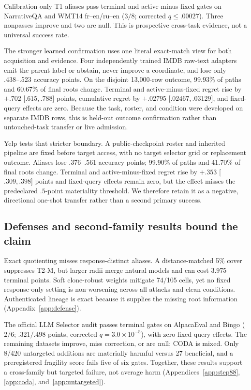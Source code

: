 Calibration-only T1 aliases pass terminal and active-minus-fixed gates on NarrativeQA and WMT14 fr--en/ru--en ($3/8$; corrected $q\leq.00027$). Three nonpasses improve and two are null. This is prospective cross-task evidence, not a universal success rate.

The stronger learned confirmation uses one literal exact-match view for both acquisition and evidence. Four independently trained IMDB raw-text adapters emit the parent label or abstain, never improve a coordinate, and lose only .438--.523 accuracy points. On the disjoint 13,000-row outcome, 99.93\% of paths and 60.67\% of final roots change. Terminal and active-minus-fixed regret rise by $+.702$ [$.615,.788$] points, cumulative regret by $+.02795$ [$.02467,.03129$], and fixed-query effects are zero. Because the task, roster, and condition were developed on separate IMDB rows, this is held-out outcome confirmation rather than untouched-task transfer or live admission.

Yelp tests that stricter boundary. A public-checkpoint roster and inherited pipeline are fixed before target access, with no target selector grid or replacement outcome. Aliases lose .376--.561 accuracy points; 99.90\% of paths and 41.70\% of final roots change. Terminal and active-minus-fixed regret rise by $+.353$ [$.309,.398$] points and fixed-query effects remain zero, but the effect misses the predeclared $.5$-point materiality threshold. We therefore retain it as a negative, directional one-shot transfer rather than a second primary success.

\subsection{Defenses and second-family results bound the claim}

Exact quotienting misses response-distinct aliases. A distance-matched 5\% cover suppresses T2-M, but larger radii merge natural models and can cost 3.975 terminal points. Soft clone-robust weights mitigate 74/105 cells, yet no fixed response-only setting is non-worsening across all attacks and clean conditions. Authenticated lineage is exact because it supplies the missing root information (Appendix~\ref{app:defense}).

The official LLM Selector audit passes terminal gates on AlpacaEval and Bingo ($2/6$; $.321/.498$ points, corrected $q=3.0\times10^{-5}$), with zero fixed-query effects. The remaining datasets improve, miss correction, or are null; CODA is mixed. Only 8/420 untargeted additions are materially harmful versus 27 beneficial, and a preregistered fragility score fails five of six gates. Together, these results support a cross-family but targeted failure, not average harm (Appendices~\ref{app:step88}, \ref{app:coda}, and~\ref{app:untargeted}).
\FloatBarrier
